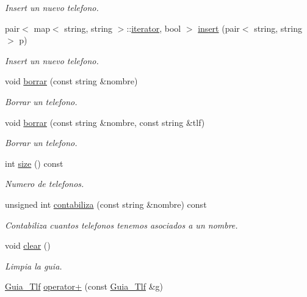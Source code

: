\begin{DoxyCompactItemize}
\begin{DoxyCompactList}\small\item\em Insert un nuevo telefono. \end{DoxyCompactList}\item 
pair$<$ map$<$ string, string $>$\+::\hyperlink{classGuia__Tlf_1_1iterator}{iterator}, bool $>$ \hyperlink{classGuia__Tlf_a773d474972ea06ed8cf1bd031536bf82}{insert} (pair$<$ string, string $>$ p)
\begin{DoxyCompactList}\small\item\em Insert un nuevo telefono. \end{DoxyCompactList}\item 
void \hyperlink{classGuia__Tlf_a57e32bbc9e76567d22e5275d4d2a6515}{borrar} (const string \&nombre)
\begin{DoxyCompactList}\small\item\em Borrar un telefono. \end{DoxyCompactList}\item 
void \hyperlink{classGuia__Tlf_af8adac24fd35985b9016a4a38cca60f4}{borrar} (const string \&nombre, const string \&tlf)
\begin{DoxyCompactList}\small\item\em Borrar un telefono. \end{DoxyCompactList}\item 
int \hyperlink{classGuia__Tlf_a727ab46d490b4196a71f623644906a81}{size} () const
\begin{DoxyCompactList}\small\item\em Numero de telefonos. \end{DoxyCompactList}\item 
unsigned int \hyperlink{classGuia__Tlf_a5589a65f9ad68fc0c3d5181680078543}{contabiliza} (const string \&nombre) const
\begin{DoxyCompactList}\small\item\em Contabiliza cuantos telefonos tenemos asociados a un nombre. \end{DoxyCompactList}\item 
\mbox{\label{classGuia__Tlf_a36ac970ece51a62763bb3898159d0047}} 
void \hyperlink{classGuia__Tlf_a36ac970ece51a62763bb3898159d0047}{clear} ()
\begin{DoxyCompactList}\small\item\em Limpia la guia. \end{DoxyCompactList}\item 
\hyperlink{classGuia__Tlf}{Guia\+\_\+\+Tlf} \hyperlink{classGuia__Tlf_a3e0b08a1985d3c72853690730319172f}{operator+} (const \hyperlink{classGuia__Tlf}{Guia\+\_\+\+Tlf} \&g)

\end{DoxyCompactItemize}
